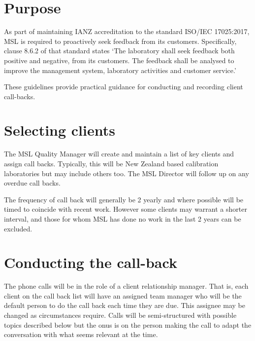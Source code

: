 \section{Purpose}


As part of maintaining IANZ accreditation to the standard ISO/IEC 17025:2017, MSL is required to proactively seek feedback from its customers.  Specifically, clause 8.6.2 of that standard states ‘The laboratory shall seek feedback both positive and negative, from its customers.  The feedback shall be analysed to improve the management system, laboratory activities and customer service.’

These guidelines provide practical guidance for conducting and recording client call-backs.

\section{Selecting clients}

The MSL Quality Manager will create and maintain a list of key clients and assign call backs.  Typically, this will be New Zealand based calibration laboratories but may include others too.  The MSL Director will follow up on any overdue call backs.

The frequency of call back will generally be 2 yearly and where possible will be timed to coincide with recent work.  However some clients may warrant a shorter interval, and those for whom MSL has done no work in the last 2 years can be excluded.

\section{Conducting the call-back}
\label{s:conducting_call_backs}

The phone calls will be in the role of a client relationship manager.  That is, each client on the call back list will have an assigned team manager who will be the default person to do the call back each time they are due.  This assignee may be changed as circumstances require.  Calls will be semi-structured with possible topics described below but the onus is on the person making the call to adapt the conversation with what seems relevant at the time.

